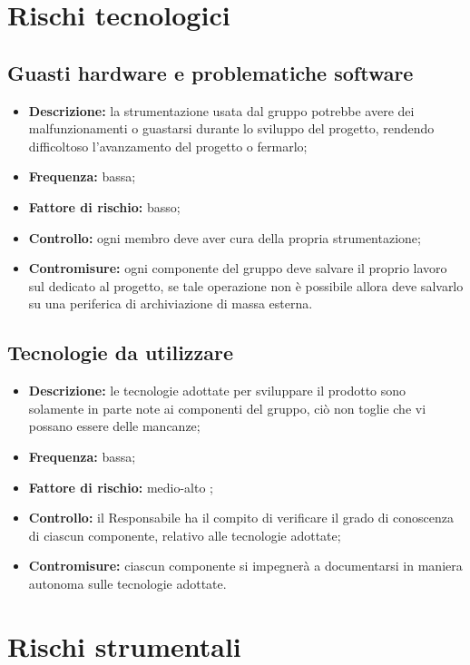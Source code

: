 \documentclass[./PianodiProgetto.tex]{subfiles}
\begin{document}
\section{Rischi tecnologici}
\subsection{Guasti hardware e problematiche software}
\begin{itemize}
	\item \textbf{Descrizione:} la strumentazione usata dal gruppo potrebbe avere dei malfunzionamenti o guastarsi durante lo sviluppo del progetto, rendendo difficoltoso l'avanzamento del progetto o fermarlo;
	\item \textbf{Frequenza:} bassa;
	\item \textbf{Fattore di rischio:} basso;
	\item \textbf{Controllo:} ogni membro deve aver cura della propria strumentazione;
	\item \textbf{Contromisure:} ogni componente del gruppo deve salvare il proprio lavoro sul   dedicato al progetto, se tale operazione non è possibile allora deve salvarlo su una periferica di archiviazione di massa esterna.
\end{itemize}

\subsection{Tecnologie da utilizzare}
\begin{itemize}
	\item \textbf{Descrizione:} le tecnologie adottate per sviluppare il prodotto sono solamente in parte note ai componenti del gruppo, ciò non toglie che vi possano essere delle mancanze;
	\item \textbf{Frequenza:} bassa;
	\item \textbf{Fattore di rischio:} medio-alto ;
	\item \textbf{Controllo:} il Responsabile ha il compito di verificare il grado di conoscenza di ciascun componente, relativo alle tecnologie adottate;
	\item \textbf{Contromisure:} ciascun componente si impegnerà a documentarsi in maniera autonoma sulle tecnologie adottate. 
\end{itemize}

\section{Rischi strumentali}
\end{document}
